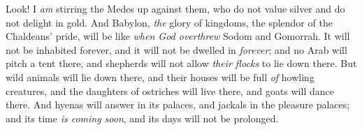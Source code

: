 \begin{biblechapter}
\verse Look! I \textit{am} stirring the Medes up against them, 
who do not value silver 
and do not delight in gold.
\verse And Babylon, \textit{the} glory of kingdoms, the splendor of the Chaldeans’ pride, will be like \textit{when God overthrew} Sodom and Gomorrah.
\verse It will not be inhabited forever, 
and it will not be dwelled in \textit{forever}; 
and no Arab will pitch a tent there, 
and shepherds will not allow \textit{their flocks} to lie down there.
\verse But wild animals will lie down there, 
and their houses will be full \textit{of} howling creatures, 
and the daughters of ostriches will live there, 
and goats will dance there.
\verse And hyenas will answer in its palaces, 
and jackals in the pleasure palaces; 
and its time \textit{is coming soon}, 
and its days will not be prolonged.
\end{biblechapter}

